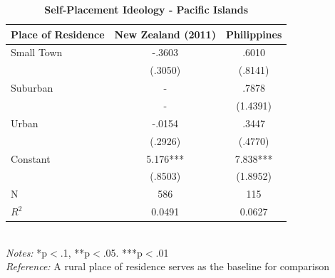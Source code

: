 \documentclass[12pt, titlepage]{article}
\newcommand\e{\emph}
\newcommand\tb{\textbf}
\begin{document}
\begin{singlespace}
	\begin{table}[H]
		\centering
		\caption{\tb{Self-Placement Ideology - Pacific Islands}}
		\begin{tabulary}{\linewidth}{l c c }

			\hline
			\tb{Place of Residence}&\tb{New Zealand (2011)}&\tb{Philippines}\\
			\hline
			Small Town & -.3603  & .6010  \\      
			& (.3050) & (.8141)    \\
			Suburban  & -   & .7878  \\ 
			 & -   & (1.4391)       \\
			Urban  & -.0154   & .3447 \\
			 &(.2926)   & (.4770)      \\
			Constant  & 5.176***  & 7.838***   \\
			&(.8503)&(1.8952) \\
			N  &586 & 115  \\
			$R^2$  &0.0491  &0.0627     \\
			\hline                                       
		\end{tabulary} 
		\\
		\e{Notes:} *p$<$.1, **p$<$.05. ***p$<$.01 \\
		\e{Reference:} A rural place of residence serves as the baseline for comparison
		\label{table13}
	\end{table}
\end{singlespace}
\end{document}

